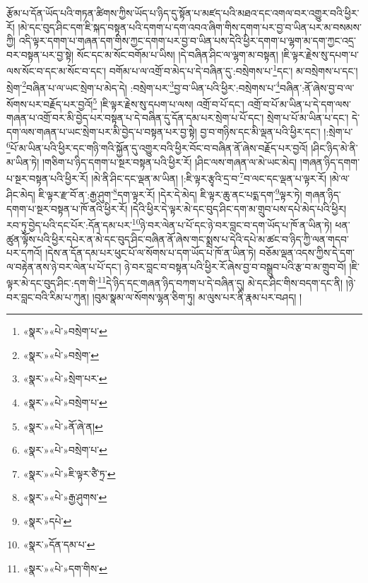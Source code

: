 རྩོམ་པ་དོན་ཡོད་པའི་གཏན་ཚིགས་ཀྱིས་ཡོད་པ་ཉིད་དུ་སྟོན་པ་མཛད་པའི་མཐའ་དང་འགལ་བར་འགྱུར་བའི་ཕྱིར་རོ། །མེ་དང་བུད་ཤིང་དག་ཇི་སྐད་བསྟན་པའི་དགག་པ་དག་འབའ་ཞིག་གིས་དགག་པར་བྱ་བ་ཡིན་པར་མ་བསམས་ཀྱི། འདི་ལྟར་དགག་པ་གཞན་དག་གིས་ཀྱང་དགག་པར་བྱ་བ་ཡིན་པས་དེའི་ཕྱིར་དགག་པ་ལྷག་མ་དག་ཀྱང་འདྲ་བར་བསྟན་པར་བྱ་སྟེ། སོང་དང་མ་སོང་བགོམ་པ་ཡིས། །དེ་བཞིན་ཤིང་ལ་ལྷག་མ་བསྟན། །ཇི་ལྟར་རྗེས་སུ་དཔག་པ་ལས་སོང་བ་དང་མ་སོང་བ་དང་། བགོམ་པ་ལ་འགྲོ་བ་མེད་པ་དེ་བཞིན་དུ་:བསྲེགས་པ་\footnote{«སྣར་»«པེ་»བསྲེག་པ་}དང་། མ་བསྲེགས་པ་དང་། སྲེག་\footnote{«སྣར་»«པེ་»བསྲེག་}བཞིན་པ་ལ་ཡང་སྲེག་པ་མེད་དེ། :བསྲེག་པར་\footnote{«སྣར་»«པེ་»སྲེག་པར་}བྱ་བ་ཡིན་པའི་ཕྱིར་:བསྲེགས་པ་\footnote{«སྣར་»«པེ་»བསྲེག་པ་}བཞིན་:ནོ་ཞེས་བྱ་བ་ལ་སོགས་པར་བརྗོད་པར་བྱའོ།\footnote{«སྣར་»«པེ་»ནོ་ཞེ་ན།} །ཇི་ལྟར་རྗེས་སུ་དཔག་པ་ལས། འགྲོ་བ་པོ་དང་། འགྲོ་བ་པོ་མ་ཡིན་པ་དེ་དག་ལས་གཞན་པ་འགྲོ་བར་མི་བྱེད་པར་བསྟན་པ་དེ་བཞིན་དུ་དོན་དམ་པར་སྲེག་པ་པོ་དང་། སྲེག་པ་པོ་མ་ཡིན་པ་དང་། དེ་དག་ལས་གཞན་པ་ཡང་སྲེག་པར་མི་བྱེད་པ་བསྟན་པར་བྱ་སྟེ། བྱ་བ་གཉིས་དང་མི་ལྡན་པའི་ཕྱིར་དང་། །:སྲེག་པ་\footnote{«སྣར་»«པེ་»བསྲེག་པ་}པོ་མ་ཡིན་པའི་ཕྱིར་དང་གཉི་གའི་སྐྱོན་དུ་འགྱུར་བའི་ཕྱིར་བོང་བ་བཞིན་ནོ་ཞེས་བརྗོད་པར་བྱའོ། །ཤིང་ཉིད་མེ་ནི་མ་ཡིན་ཏེ། །གཅིག་པ་ཉིད་དགག་པ་སྔར་བསྟན་པའི་ཕྱིར་རོ། །ཤིང་ལས་གཞན་ལ་མེ་ཡང་མེད། །གཞན་ཉིད་དགག་པ་སྔར་བསྟན་པའི་ཕྱིར་རོ། །མེ་ནི་ཤིང་དང་ལྡན་མ་ཡིན། །:ཇི་ལྟར་རྩྭའི་དྲ་བ་\footnote{«སྣར་»«པེ་»ཇི་ལྟར་ཙཻ་ཏྲ་}བ་ལང་དང་ལྡན་པ་ལྟར་རོ། །མེ་ལ་ཤིང་མེད། ཇི་ལྟར་རྫ་བོ་ན་:རྒྱ་ཤུག་\footnote{«སྣར་»«པེ་»རྒྱ་ཤུགས་}དག་ལྟར་རོ། །དེར་དེ་མེད། ཇི་ལྟར་ཆུ་ནང་པདྨ་དག་\footnote{«སྣར་»དཔེ་}ལྟར་ཏེ། གཞན་ཉིད་དགག་པ་སྔར་བསྟན་པ་ཁོ་ནའི་ཕྱིར་རོ། །དེའི་ཕྱིར་དེ་ལྟར་མེ་དང་བུད་ཤིང་དག་མ་གྲུབ་པས་དཔེ་མེད་པའི་ཕྱིར། རབ་ཏུ་བྱེད་པའི་དང་པོར་:དོན་དམ་པར་\footnote{«སྣར་»དོན་དམ་པ་}ཉེ་བར་ལེན་པ་པོ་དང་ཉེ་བར་བླང་བ་དག་ཡོད་པ་ཁོ་ན་ཡིན་ཏེ། ཕན་ཚུན་ལྟོས་པའི་ཕྱིར་དཔེར་ན་མེ་དང་བུད་ཤིང་བཞིན་ནོ་ཞེས་གང་སྨྲས་པ་དེའི་དཔེ་མ་ཚང་བ་ཉིད་ཀྱི་ལན་གདབ་པར་དཀའོ། །དེས་ན་དོན་དམ་པར་ཕུང་པོ་ལ་སོགས་པ་དག་ཡོད་པ་ཁོ་ན་ཡིན་ཏེ། བཅོམ་ལྡན་འདས་ཀྱིས་དེ་དག་ལ་བརྟེན་ནས་ཉེ་བར་ལེན་པ་པོ་དང་། ཉེ་བར་བླང་བ་བསྟན་པའི་ཕྱིར་རོ་ཞེས་བྱ་བ་བསྒྲུབ་པའི་རྩ་བ་མ་གྲུབ་བོ། །ཇི་ལྟར་མེ་དང་བུད་ཤིང་:དག་གི་\footnote{«སྣར་»«པེ་»དག་གིས་}དེ་ཉིད་དང་གཞན་ཉིད་བཀག་པ་དེ་བཞིན་དུ། མེ་དང་ཤིང་གིས་བདག་དང་ནི། །ཉེ་བར་བླང་བའི་རིམ་པ་ཀུན། །བུམ་སྣམ་ལ་སོགས་ལྷན་ཅིག་ཏུ། མ་ལུས་པར་ནི་རྣམ་པར་བཤད། །
